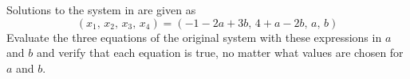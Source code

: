 Solutions to the system in  are given as
%
\begin{equation*}
(x_1,\,x_2,\,x_3,\,x_4)=(-1-2a+3b,\,4+a-2b,\,a,\,b)
\end{equation*}
%
Evaluate the three equations of the original system with these expressions in  $a$ and $b$ and verify that each equation is true, no matter what values are chosen for $a$ and $b$.
